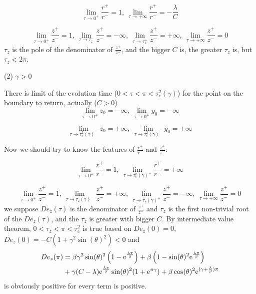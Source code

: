 \documentclass[a4paper,10pt]{article}
\begin{document}
\begin{enumerate}
		$$
		\lim_{\tau \rightarrow 0^+} \frac{r^+}{r^-} =1,~ \lim_{\tau \rightarrow +\infty} \frac{r^+}{r^-} = -\frac{\lambda}{C} 
		$$
		
	    $$
		\lim_{\tau \rightarrow 0^+} \frac{z^+}{z^-} =1,
		~ \lim_{\tau \rightarrow \tau_z^-} \frac{z^+}{z^-}  = -\infty ,
		~\lim_{\tau \rightarrow \tau_z^+} \frac{z^+}{z^-}   = +\infty ,
		~\lim_{\tau \rightarrow +\infty} \frac{z^+}{z^-}    = 0
		$$
		$\tau_z$ is the pole of the denominator of $\frac{z^+}{z^-}$, and the bigger $C$ is, the greater $\tau_z$ is, but $\tau_z < 2\pi$.
		
		(2) $\gamma >0$
		
		There is limit of the evolution time ($0<\tau <\pi<\tau_c^2(\gamma)$) for the point on the boundary to return, actually ($C >0 $)
		$$ 
		\lim_{\tau \rightarrow 0^+} z_0 = - \infty,~\lim_{\tau \rightarrow 0^+} y_0 = -\infty
		$$
		
		$$ 
		\lim_{\tau \rightarrow \tau_c^2(\gamma)^-} z_0 = + \infty,~\lim_{\tau \rightarrow \tau_c^2(\gamma)^-} y_0 = +\infty
		$$
		
		Now we should try to know the features of $\frac{r^+}{r^-}$ and $\frac{z^+}{z^-}$:
		
		$$
		\lim_{\tau \rightarrow 0^+} \frac{r^+}{r^-} =1,~ \lim_{\tau \rightarrow \tau_c^2(\gamma)^-} \frac{r^+}{r^-} = +\infty 
		$$
		
		$$
		\lim_{\tau \rightarrow 0^+} \frac{z^+}{z^-} =1,
		~ \lim_{\tau \rightarrow \tau_z(\gamma)^-} \frac{z^+}{z^-}  = +\infty ,
		~\lim_{\tau \rightarrow \tau_z(\gamma)^+} \frac{z^+}{z^-}   = -\infty ,
		~\lim_{\tau \rightarrow +\infty} \frac{z^+}{z^-}    = 0
		$$
		we suppose $De_z(\tau)$ is the denominator of $\frac{z^+}{z^-}$ and 
		$\tau_z$ is the first non-trivial root of the $De_z(\tau)$, and the $\tau_z$ is greater with bigger $C$. By intermediate value theorem, $0< \tau_z < \pi <\tau_c^2$ is true based on  $De_z(0)=0$, $\displaystyle \dot{De_z}(0)= - C(1+\gamma^2 \sin(\theta)^2)<0$ and
		\begin{align}
			\nonumber
			De_z(\pi) &= 
		\beta \gamma^{2} \sin(\theta )^2 \left(1-{\mathrm e}^{\frac{\lambda  \pi}{\beta}}\right)
		+\beta  \left(1-\sin(\theta )^{2} {\rm e}^{\frac{\lambda  \pi}{\beta}}\right) \\
		&+\gamma  (C-\lambda) {\rm e}^{\frac{\lambda  \pi}{\beta}} \sin(\theta )^2 (1+{\rm e}^{\pi  \gamma})
		+\beta  \cos(\theta )^2 {\rm e}^{(\gamma +\frac{\lambda}{\beta}) \pi}
		\end{align}
		is obviously positive for every term is positive.
		

\end{enumerate}
\end{document}
